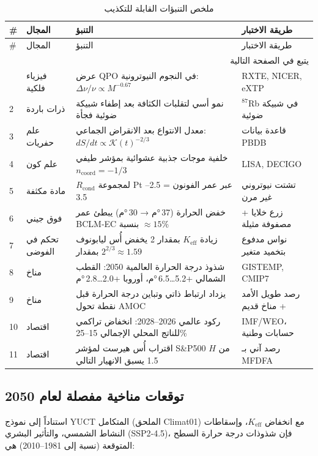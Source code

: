 \documentclass[12pt,a4paper]{article}
\newcommand{\Keff}{K_{\mathrm{eff}}}
\newcommand{\REL}{\mathcal{K}}
\begin{document}
	\begin{longtable}{|p{2cm}|p{3cm}|p{4.5cm}|p{4cm}|}
		\caption{ملخص التنبؤات القابلة للتكذيب}\label{tab:predictions}\\
		\hline
		\textbf{\#} & \textbf{المجال} & \textbf{التنبؤ} & \textbf{طريقة الاختبار} \\
		\hline
		\endfirsthead
		\hline
		\# & المجال & التنبؤ & طريقة الاختبار \\
		\hline
		\endhead
		\hline
		\multicolumn{4}{r}{يتبع في الصفحة التالية} \\
		\endfoot
		\hline
		\endlastfoot
		1 & فيزياء فلكية & عرض QPO في النجوم النيوترونية: \(\Delta\nu/\nu \propto M^{-0.67}\) & RXTE, NICER, eXTP \\
		2 & ذرات باردة & نمو أسي لتقلبات الكثافة بعد إطفاء شبيكة ضوئية فجأة & \({}^{87}\)Rb في شبيكة ضوئية \\
		3 & علم حفريات & معدل الانتواع بعد الانقراض الجماعي: \(dS/dt \propto \REL(t)^{-2/3}\) & قاعدة بيانات PBDB \\
		4 & علم كون & خلفية موجات جذبية عشوائية بمؤشر طيفي \(n_{\mathrm{coord}} = -1/3\) & LISA, DECIGO \\
		5 & مادة مكثفة & \(R_{\text{cond}}\) لمجموعة Pt عبر عمر الفونون = 2.5–3.5 & تشتت نيوتروني غير مرن \\
		6 & فوق جيني & خفض الحرارة (37 °م → 30 °م) يبطئ عمر BCLM‑EC بنسبة \(\approx 15\%\) & زرع خلايا + مصفوفة مثيلة \\
		7 & تحكم في الفوضى & زيادة \(\Keff\) بمقدار 2 يخفض أُس ليابونوف بمقدار \(2^{2/3} \approx 1.59\) & نواس مدفوع بتخميد متغير \\
		8 & مناخ & شذوذ درجة الحرارة العالمية 2050: القطب الشمالي +5.2…6.5 °م، أوروبا +2.0…2.8 °م & GISTEMP, CMIP7 \\
		9 & مناخ & يزداد ارتباط ذاتي وتباين درجة الحرارة قبل نقطة تحول AMOC & رصد طويل الأمد + مناخ قديم \\
		10 & اقتصاد & ركود عالمي 2026–2028: انخفاض تراكمي للناتج المحلي الإجمالي 15–25\% & IMF/WEO، حسابات وطنية \\
		11 & اقتصاد & اقتراب أُس هيرست لمؤشر S\&P500 \(H\) من 1.5 يسبق الانهيار التالي & رصد آني بـ MFDFA \\
	\end{longtable}
	
	\subsection{توقعات مناخية مفصلة لعام 2050}
	استناداً إلى نموذج YUCT المتكامل (الملحق Climat01) مع انخفاض \(\Keff\)، وإسقاطات النشاط الشمسي، والتأثير البشري (SSP2‑4.5)، فإن شذوذات درجة حرارة السطح المتوقعة (نسبة إلى 1981–2010) هي:
	
\end{document}

